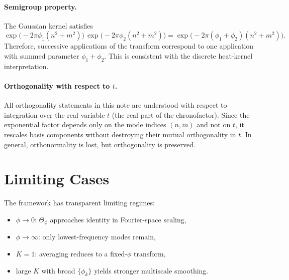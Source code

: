\documentclass[11pt]{article}
\begin{document}
\paragraph{Semigroup property.}
The Gaussian kernel satisfies
\[
\exp\!\big(-2\pi\phi_1(n^2+m^2)\big)\,\exp\!\big(-2\pi\phi_2(n^2+m^2)\big)
=\exp\!\big(-2\pi(\phi_1+\phi_2)(n^2+m^2)\big).
\]
Therefore, successive applications of the transform correspond to one application with summed parameter $\phi_1+\phi_2$. This is consistent with the discrete heat-kernel interpretation.

\paragraph{Orthogonality with respect to $t$.}
All orthogonality statements in this note are understood with respect to integration over the real variable $t$ (the real part of the chronofactor). Since the exponential factor depends only on the mode indices $(n,m)$ and not on $t$, it rescales basis components without destroying their mutual orthogonality in $t$. In general, orthonormality is lost, but orthogonality is preserved.

\section{Limiting Cases}
The framework has transparent limiting regimes:
\begin{itemize}
    \item $\phi\to 0$: $\Theta_{\phi}$ approaches identity in Fourier-space scaling,
    \item $\phi\to \infty$: only lowest-frequency modes remain,
    \item $K=1$: averaging reduces to a fixed-$\phi$ transform,
    \item large $K$ with broad $\{\phi_k\}$ yields stronger multiscale smoothing.
\end{itemize}
\end{document}
